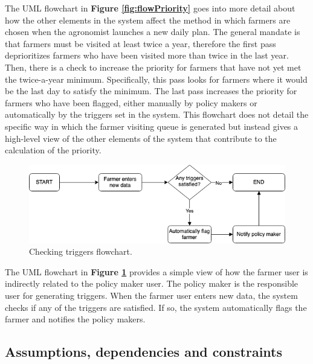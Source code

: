 \begin{flushleft}
The UML flowchart in \textbf{Figure \ref{fig:flowPriority}} goes into more detail about how the other elements in the system affect the method in which farmers are chosen when the agronomist launches a new daily plan. The general mandate is that farmers must be visited at least twice a year, therefore the first pass deprioritizes farmers who have been visited more than twice in the last year. Then, there is a check to increase the priority for farmers that have not yet met the twice-a-year minimum. Specifically, this pass looks for farmers where it would be the last day to satisfy the minimum. The last pass increases the priority for farmers who have been flagged, either manually by policy makers or automatically by the triggers set in the system. This flowchart does not detail the specific way in which the farmer visiting queue is generated but instead gives a high-level view of the other elements of the system that contribute to the calculation of the priority. 
\end{flushleft}


\newpage


\begin{figure}[hbt!]
\centering
\includegraphics[scale=0.4]{../images_diagrams/newfarmerdata_trigger.png}
\caption{\label{fig:flowNewDataTrig}Checking triggers flowchart.}
\end{figure}

\begin{flushleft}
The UML flowchart in \textbf{Figure \ref{fig:flowNewDataTrig}} provides a simple view of how the farmer user is indirectly related to the policy maker user. The policy maker is the responsible user for generating triggers. When the farmer user enters new data, the system checks if any of the triggers are satisfied. If so, the system automatically flags the farmer and notifies the policy makers. 
\end{flushleft}

\newpage
\subsection{Assumptions, dependencies and constraints}

